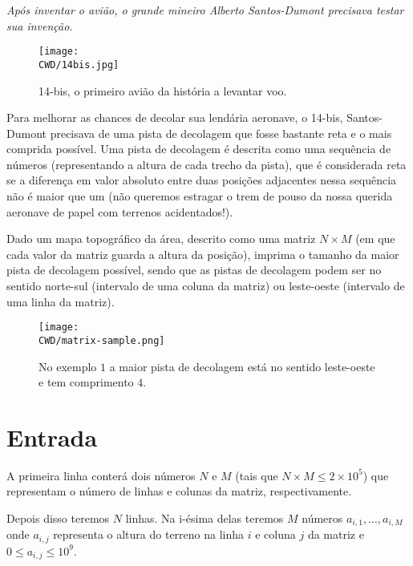 %

\begin{center}
\textit{Após inventar o avião, o grande mineiro Alberto Santos-Dumont precisava testar sua invenção.}
\end{center}

\begin{figure}[H]
  \centering
  \texttt{[image: \\CWD/14bis.jpg]}
  \caption{14-bis, o primeiro avião da história a levantar voo.}
\end{figure}

Para melhorar as chances de decolar sua lendária aeronave, o 14-bis, Santos-Dumont precisava de uma pista de decolagem que fosse bastante reta e o mais comprida possível. Uma pista de decolagem é descrita como uma sequência de números (representando a altura de cada trecho da pista), que é considerada reta se a diferença em valor absoluto entre duas posições adjacentes nessa sequência não é maior que um (não queremos estragar o trem de pouso da nossa querida aeronave de papel com terrenos acidentados!).

Dado um mapa topográfico da área, descrito como uma matriz $N\times M$ (em que cada valor da matriz guarda a altura da posição), imprima o tamanho da maior pista de decolagem possível, sendo que as pistas de decolagem podem ser no sentido norte-sul (intervalo de uma coluna da matriz) ou leste-oeste (intervalo de uma linha da matriz).

\begin{figure}[H]
  \centering
  \texttt{[image: \\CWD/matrix-sample.png]}
  \caption{No exemplo $1$ a maior pista de decolagem está no sentido leste-oeste e tem comprimento $4$.}
\end{figure}
%
%
\section*{Entrada}

A primeira linha conterá dois números $N$ e $M$ (tais que $N \times M \leq 2\times 10^5$) que representam o número de linhas e colunas da matriz, respectivamente.

Depois disso teremos $N$ linhas. Na i-ésima delas teremos $M$ números $a_{i, 1}, \ldots, a_{i, M}$ onde $a_{i, j}$ representa o altura do terreno na linha $i$ e coluna $j$ da matriz e $0 \leq a_{i, j} \leq 10^9$.

